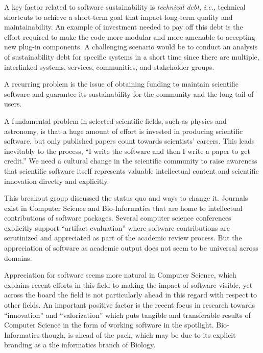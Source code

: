 \documentclass[a4paper,UKenglish]{dagrep}
\newcommand{\ie}{\emph{i.e.},\xspace}
\begin{document}
A key factor related to software sustainability is \emph{technical debt}, \ie technical shortcuts to achieve a short-term goal that impact long-term quality and maintainability.
An example of investment needed to pay off this debt is the effort required to make the code more modular and more amenable to accepting new plug-in components.
A challenging scenario would be to conduct an analysis of sustainability debt for specific systems in a short time since there are multiple, interlinked systems, services, communities, and stakeholder groups.

A recurring problem is the issue of obtaining funding to maintain scientific software and guarantee its sustainability for the community and the long tail of users.



A fundamental problem in selected scientific fields, such as physics and astronomy, is that a huge amount of effort is invested in producing scientific software, but only published papers count towards scientists' careers. This leads inevitably to the process, ``I write the software and then I write a paper to get credit.'' We need a cultural change in the scientific community to raise awareness that scientific software itself represents valuable intellectual content and scientific innovation directly and explicitly.

This breakout group discussed the status quo and ways to change it. Journals exist in Computer Science and Bio-Informatics that are home to intellectual contributions of software packages. Several computer science conferences explicitly support ``artifact evaluation'' where software contributions are scrutinized and appreciated as part of the academic review process. But the appreciation of software as academic output does not seem to be universal across domains.

Appreciation for software seems more natural in Computer Science, which explains recent efforts in this field to making the impact of software visible, yet across the board the field is not particularly ahead in this regard with respect to other fields. An important positive factor is the recent focus in research towards ``innovation'' and ``valorization'' which puts tangible and transferable results of Computer Science in the form of working software in the spotlight. Bio-Informatics though, is ahead of the pack, which may be due to its explicit branding as a the informatics branch of Biology.
\end{document}
